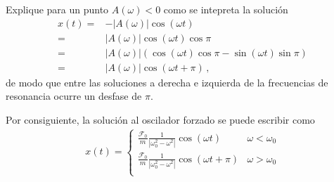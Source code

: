\example{}
Explique para un punto $A(\omega)<0$ como se intepreta la solución
\begin{align}
  x(t)=&-|A(\omega)|\cos(\omega t)\nonumber\\
  =&|A(\omega)|\cos(\omega t)\cos\pi\nonumber\\
  =&|A(\omega)|\left(\cos(\omega t)\cos\pi-\sin(\omega t)\sin\pi  \right)\nonumber\\
  =&|A(\omega)|\cos(\omega t+\pi)\,,
\end{align}
de modo que entre las soluciones a derecha e izquierda de la frecuencias de resonancia ocurre un desfase de $\pi$.

Por consiguiente, la solución al oscilador forzado se puede escribir como
\begin{align*}
  x(t)=\begin{cases}
  \frac{\mathcal{F}_0}{m}\frac{1}{|\omega_0^2-\omega^2|}\cos(\omega t) & \omega<\omega_0\\
  \frac{\mathcal{F}_0}{m}\frac{1}{|\omega_0^2-\omega^2|}\cos(\omega t+\pi) & \omega>\omega_0\\
  \end{cases}
\end{align*}



